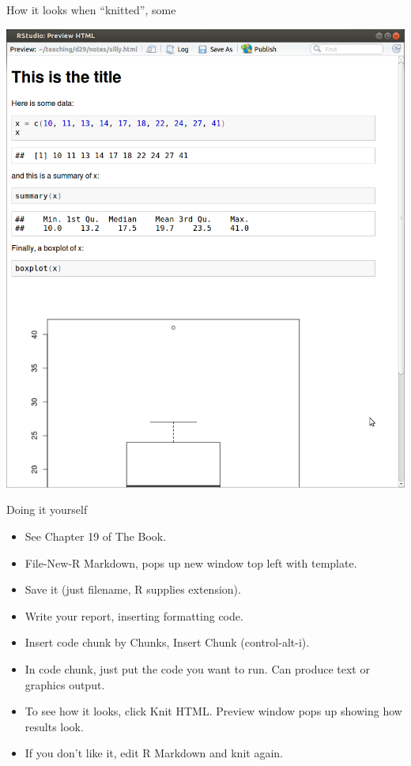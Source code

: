 \begin{frame}[fragile]{How it looks when ``knitted'', some}
  
  \includegraphics[height=\textheight]{silly}
  
\end{frame}

\begin{frame}[fragile]{Doing it yourself}
  
  \begin{itemize}
  \item See Chapter 19 of The Book.
  \item File-New-R Markdown, pops up new window top left with template.
  \item Save it (just filename, R supplies extension).
  \item Write your report, inserting formatting code.
  \item Insert code chunk by Chunks, Insert Chunk (control-alt-i).
  \item In code chunk, just put the code you want to run. Can produce
    text or graphics output.
  \item To see how it looks, click Knit HTML. Preview window pops up
    showing how results look.
  \item If you don't like it, edit R Markdown and knit again.
  \end{itemize}
  
\end{frame}

